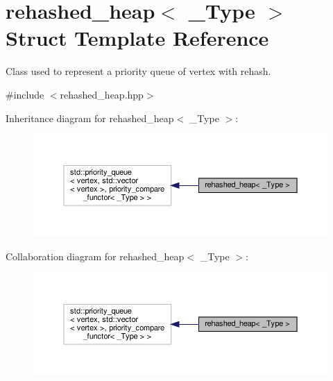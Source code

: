 \hypertarget{structrehashed__heap}{}\section{rehashed\+\_\+heap$<$ \+\_\+\+Type $>$ Struct Template Reference}
\label{structrehashed__heap}


Class used to represent a priority queue of vertex with rehash.  




{\ttfamily \#include $<$rehashed\+\_\+heap.\+hpp$>$}



Inheritance diagram for rehashed\+\_\+heap$<$ \+\_\+\+Type $>$\+:
\nopagebreak
\begin{figure}[H]
\begin{center}
\leavevmode
\includegraphics[width=350pt]{d7/d3e/structrehashed__heap__inherit__graph}
\end{center}
\end{figure}


Collaboration diagram for rehashed\+\_\+heap$<$ \+\_\+\+Type $>$\+:
\nopagebreak
\begin{figure}[H]
\begin{center}
\leavevmode
\includegraphics[width=350pt]{d4/d6e/structrehashed__heap__coll__graph}
\end{center}
\end{figure}
